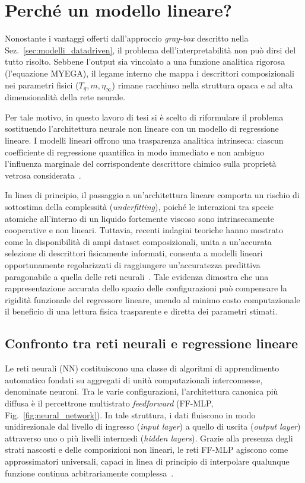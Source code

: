 \documentclass[../main.tex]{subfiles}
\begin{document}
	\section{Perché un modello lineare?}
	\label{sec:perche_modello_lineare}
	
	Nonostante i vantaggi offerti dall'approccio \textit{gray-box} descritto nella Sez.~\ref{sec:modelli_datadriven}, il problema dell'interpretabilità non può dirsi del tutto risolto. Sebbene l'output sia vincolato a una funzione analitica rigorosa (l'equazione MYEGA), il legame interno che mappa i descrittori composizionali nei parametri fisici ($T_g, m, \eta_\infty$) rimane racchiuso nella struttura opaca e ad alta dimensionalità della rete neurale.
	
	Per tale motivo, in questo lavoro di tesi si è scelto di riformulare il problema sostituendo l'architettura neurale non lineare con un modello di regressione lineare. I modelli lineari offrono una trasparenza analitica intrinseca: ciascun coefficiente di regressione quantifica in modo immediato e non ambiguo l'influenza marginale del corrispondente descrittore chimico sulla proprietà vetrosa considerata~\cite{rudinStopExplainingBlack2019}.
	
	In linea di principio, il passaggio a un'architettura lineare comporta un rischio di sottostima della complessità (\textit{underfitting}), poiché le interazioni tra specie atomiche all'interno di un liquido fortemente viscoso sono intrinsecamente cooperative e non lineari. Tuttavia, recenti indagini teoriche hanno mostrato come la disponibilità di ampi dataset composizionali, unita a un'accurata selezione di descrittori fisicamente informati, consenta a modelli lineari opportunamente regolarizzati di raggiungere un'accuratezza predittiva paragonabile a quella delle reti neurali~\cite{sharmaInterpretabilityLinearRegression2026}. Tale evidenza dimostra che una rappresentazione accurata dello spazio delle configurazioni può compensare la rigidità funzionale del regressore lineare, unendo al minimo costo computazionale il beneficio di una lettura fisica trasparente e diretta dei parametri stimati.
	
	
	\subsection{Confronto tra reti neurali e regressione lineare}
	\label{sec:reti_neurali}
	
	Le reti neurali (NN) costituiscono una classe di algoritmi di apprendimento automatico fondati su aggregati di unità computazionali interconnesse, denominate neuroni. Tra le varie configurazioni, l'architettura canonica più diffusa è il percettrone multistrato \textit{feedforward} (FF-MLP, Fig.~\ref{fig:neural_network}). In tale struttura, i dati fluiscono in modo unidirezionale dal livello di ingresso (\textit{input layer}) a quello di uscita (\textit{output layer}) attraverso uno o più livelli intermedi (\textit{hidden layers}). Grazie alla presenza degli strati nascosti e delle composizioni non lineari, le reti FF-MLP agiscono come approssimatori universali, capaci in linea di principio di interpolare qualunque funzione continua arbitrariamente complessa~\cite{hornikMultilayerFeedforwardNetworks1989}.
	
\end{document}
